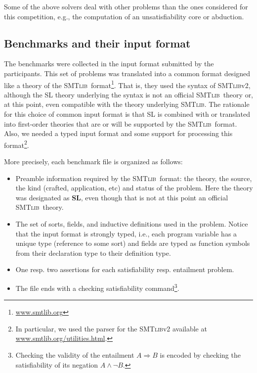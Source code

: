 \documentclass[twoside,11pt]{article}
\newcommand{\limp}{\Rightarrow}
\newcommand{\smtlib}{\textsc{SMTlib}}
\begin{document}
Some of the above solvers deal with other problems than the ones considered for this competition, e.g., the computation of an unsatisfiability core or abduction.


\subsection{Benchmarks and their input format}
The benchmarks were collected in the input format submitted by the participants.
This set of problems was translated into a common format designed like a theory of the \smtlib\ format\footnote{\url{www.smtlib.org}}. That is, they used the syntax of \smtlib v2, although the SL theory underlying the syntax is not an official \smtlib\ theory or, at this point, even compatible with the theory underlying \smtlib.
The rationale for this choice of common input format is 
that SL is combined with or translated into first-order theories that are or will be supported by the \smtlib\ format.
Also, we needed a typed input format and some support for processing this format\footnote{In particular, we used the parser for the \smtlib v2 available at \url{www.smtlib.org/utilities.html}.}.
 
More precisely, each benchmark file is organized as follows:
\begin{itemize}
\item Preamble information required by the \smtlib\ format: the theory, the source, the kind (crafted, application, etc) and status of the problem.  Here the theory was designated as \textbf{SL}, even though that is not at this point an official \smtlib\ theory. %
\item The set of sorts, fields, and inductive definitions used in the problem. Notice that the input format is strongly typed, i.e., each program variable has a unique type (reference to some sort) and 
fields are typed as function symbols from their declaration type to their definition type. 
\item One resp. two assertions for each satisfiability resp. entailment problem. 
\item The file ends with a checking satisfiability command\footnote{Checking the validity of the entailment $A\limp B$ is encoded by checking the satisfiability of its negation $A \land \lnot B$.}.
\end{itemize}
\end{document}
